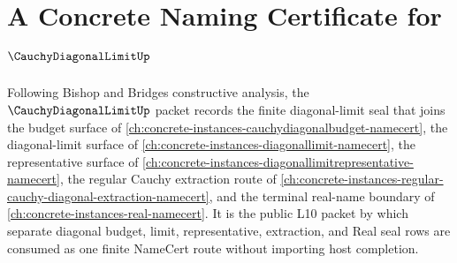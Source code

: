 \chapter{A Concrete Naming Certificate for $\CauchyDiagonalLimitUp$}
\label{ch:concrete-instances-cauchy-diagonal-limit-namecert}

Following Bishop and Bridges constructive analysis, the $\CauchyDiagonalLimitUp$ packet records the finite diagonal-limit seal that joins the budget surface of \autoref{ch:concrete-instances-cauchydiagonalbudget-namecert}, the diagonal-limit surface of \autoref{ch:concrete-instances-diagonallimit-namecert}, the representative surface of \autoref{ch:concrete-instances-diagonallimitrepresentative-namecert}, the regular Cauchy extraction route of \autoref{ch:concrete-instances-regular-cauchy-diagonal-extraction-namecert}, and the terminal real-name boundary of \autoref{ch:concrete-instances-real-namecert}. It is the public L10 packet by which separate diagonal budget, limit, representative, extraction, and Real seal rows are consumed as one finite NameCert route without importing host completion.

